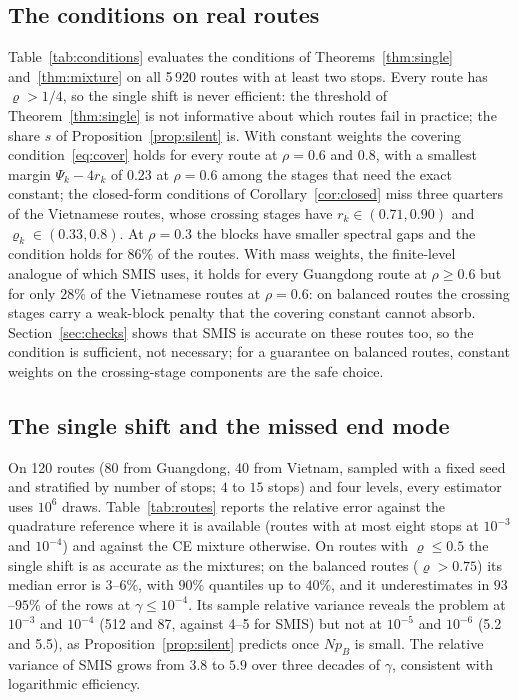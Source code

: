 \documentclass[pdflatex,sn-mathphys-ay]{sn-jnl}%
\theoremstyle{thmstyleone}%
\theoremstyle{thmstylethree}%
\theoremstyle{thmstyletwo}%
\begin{document}
\subsection{The conditions on real routes}
Table~\ref{tab:conditions} evaluates the conditions of Theorems~\ref{thm:single}
and~\ref{thm:mixture} on all 5\,920 routes with at least two stops. Every route has
$\varrho>1/4$, so the single shift is never efficient: the threshold of
Theorem~\ref{thm:single} is not informative about which routes fail in practice; the
share $s$ of Proposition~\ref{prop:silent} is. With constant weights the covering condition~\eqref{eq:cover}
holds for every route at $\rho=0.6$ and $0.8$, with a smallest margin $\Psi_k-4r_k$ of
$0.23$ at $\rho=0.6$ among the stages that need the exact constant; the closed-form
conditions of Corollary~\ref{cor:closed} miss three quarters of the Vietnamese routes,
whose crossing stages have $r_k\in(0.71,0.90)$ and $\varrho_k\in(0.33,0.8)$. At $\rho=0.3$
the blocks have smaller spectral gaps and the condition holds for $86\%$ of the routes.
With mass weights, the finite-level analogue of which SMIS uses, it holds for every
Guangdong route at $\rho\ge0.6$ but for only $28\%$ of the Vietnamese routes at
$\rho=0.6$: on balanced routes the crossing stages carry a weak-block penalty that the
covering constant cannot absorb. Section~\ref{sec:checks} shows that SMIS is accurate
on these routes too, so the condition is sufficient, not necessary; for a guarantee on
balanced routes, constant weights on the crossing-stage components are the safe
choice.



\subsection{The single shift and the missed end mode}
On 120 routes (80 from Guangdong, 40 from Vietnam, sampled with a fixed seed and
stratified by number of stops; $4$ to $15$ stops) and four levels, every estimator uses
$10^6$ draws. Table~\ref{tab:routes} reports the relative error against the quadrature
reference where it is available (routes with at most eight stops at $10^{-3}$ and
$10^{-4}$) and against the CE mixture otherwise. On routes with $\varrho\le0.5$ the single
shift is as accurate as the mixtures; on the balanced routes ($\varrho>0.75$) its median
error is $3$--$6\%$, with $90\%$ quantiles up to $40\%$, and it underestimates in
$93$--$95\%$ of the rows at $\gamma\le10^{-4}$. Its sample relative variance reveals the
problem at $10^{-3}$ and $10^{-4}$ (512 and 87, against 4--5 for SMIS) but not at
$10^{-5}$ and $10^{-6}$ (5.2 and 5.5), as Proposition~\ref{prop:silent} predicts once
$Np_B$ is small. The relative variance of SMIS grows from $3.8$ to $5.9$ over three
decades of $\gamma$, consistent with logarithmic efficiency.
\end{document}
